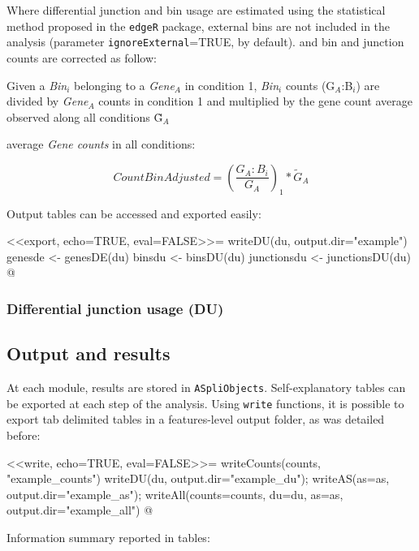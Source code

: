 \documentclass{article}
\begin{document}
Where differential junction and bin usage are estimated using the statistical method proposed in the \texttt{edgeR} package, external bins are not included in the analysis (parameter \texttt{ignoreExternal}=TRUE, by default). 
and bin and junction counts are corrected as follow:

Given a \textit{Bin$_i$} belonging to a \textit{Gene$_A$} in condition 1, \textit{Bin$_i$} counts ({G$_A$:B$_i$}) are divided by \textit{Gene$_A$} counts in condition 1 and multiplied by the gene count  average observed along all conditions \~G$_A$

average \textit{Gene counts} in all conditions:

	\[ CountBinAdjusted=(\frac{G_A:B_i}{G_A})_1 * \tilde G_A \]


Output tables can be accessed and exported easily:
 
<<export, echo=TRUE, eval=FALSE>>=
writeDU(du, output.dir="example")
genesde <- genesDE(du)
binsdu <- binsDU(du)
junctionsdu <- junctionsDU(du)
@

\subsubsection{Differential junction usage (DU)}


\subsection{Output and results} \label{sec:output}
At each module, results are stored in \texttt{ASpliObjects}. Self-explanatory tables can be exported at each step of the analysis. Using \texttt{write} functions, it is possible to export tab delimited tables in a features-level output folder, as was detailed before:

<<write, echo=TRUE, eval=FALSE>>=
writeCounts(counts, "example_counts")
writeDU(du, output.dir="example_du");
writeAS(as=as, output.dir="example_as");
writeAll(counts=counts, du=du, as=as, output.dir="example_all")
@

Information summary reported in tables:
\end{document}
